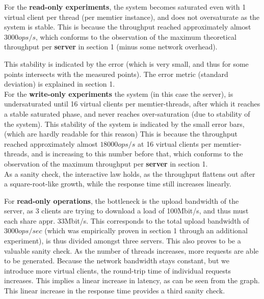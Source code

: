 \documentclass[11pt,a4paper]{article}
\begin{document}
For the \textbf{read-only experiments}, the system becomes saturated even with 1 virtual client per thread (per memtier instance), and does not oversaturate as the system is stable.
This is because the throughput reached approximately almost $3000ops/s$, which conforms to the observation of the maximum theoretical throughput per \textbf{server} in section 1 (minus some network overhead).

This stability is indicated by the error (which is very small, and thus for some points intersects with the measured points).
The error metric (standard deviation) is explained in section 1.\\

For the \textbf{write-only experiments} the system (in this case the server), is undersaturated until 16 virtual clients per memtier-threads, after which it reaches a stable saturated phase, and never reaches over-saturation (due to stability of the system).
This stability of the system is indicated by the small error bars, (which are hardly readable for this reason)
This is because the throughput reached approximately almost $18000ops/s$ at 16 virtual clients per memtier-threads, and is increasing to this number before that, which conforms to the observation of the maximum throughput per \textbf{server} in section 1.\\

As a sanity check, the interactive law holds, as the throughput flattens out after a square-root-like growth, while the response time still increases linearly.

For \textbf{read-only operations}, the bottleneck is the upload bandwidth of the server,
as 3 clients are trying to download a load of 100Mbit/s, and thus must each share appr. 33Mbit/s.
This corresponds to the total upload bandwidth of $3000ops/sec$ (which was empirically proven in section 1 through an additional experiment), is thus divided amongst  three servers.
This also proves to be a valuable sanity check.
As the number of threads increases, more requests are able to be generated.
Because the network bandwidth stays constant, but we introduce more virtual clients, the round-trip time of individual requests increases.
This implies a linear increase in latency, as can be seen from the graph.
This linear increase in the response time provides a third sanity check.
\end{document}
